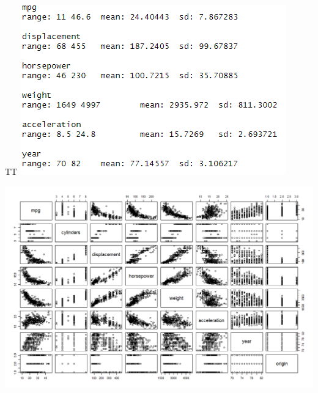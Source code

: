 \documentclass{article}
\let \extra T
\begin{document}
\ifx \extra T
\includegraphics[scale=0.5]{s1.png}

\includegraphics[scale=0.5]{e.png}
\fi

\newpage
\end{document}
